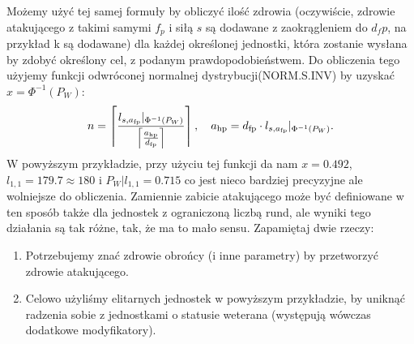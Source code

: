 \documentclass{article}
\begin{document}
Możemy użyć tej samej formuły by obliczyć ilość zdrowia (oczywiście, zdrowie atakującego z takimi samymi $f_p$ i siłą $s$ są dodawane z zaokrągleniem do $d_fp$, na przykład k są dodawane) dla każdej określonej jednostki, która zostanie wysłana by zdobyć określony cel, z podanym prawdopodobieństwem. Do obliczenia tego użyjemy funkcji odwróconej normalnej dystrybucji(NORM.S.INV) by uzyskać $x=\Phi^{-1}(P_W)$:
\begin{equation*}
    n=\left\lceil l_{s,a_\text{fp}}|_{\Phi^{-1}(P_W)} \over \left\lceil \frac{a_\text{hp}}{d_\text{fp}}\right\rceil\right\rceil,\quad a_\text{hp}=d_\text{fp}\cdot l_{s,a_\text{fp}}|_{\Phi^{-1}(P_W)}
.\end{equation*}
W powyższym przykładzie, przy użyciu tej funkcji da nam $x=0.492$, $l_{1,1}=179.7\approx180$ i $P_{W}|l_{1,1}=0.715$ co jest nieco bardziej precyzyjne ale wolniejsze do obliczenia. Zamiennie zabicie atakującego może być definiowane w ten sposób także dla jednostek z ograniczoną liczbą rund, ale wyniki tego działania są tak różne, tak, że ma to mało sensu.
\newline Zapamiętaj dwie rzeczy:
\begin{enumerate}
    \item Potrzebujemy znać zdrowie obrońcy (i inne parametry) by przetworzyć zdrowie atakującego.
    \item Celowo użyliśmy elitarnych jednostek w powyższym przykładzie, by uniknąć radzenia sobie z jednostkami o statusie weterana (występują wówczas dodatkowe modyfikatory). 
\end{enumerate}
\end{document}
